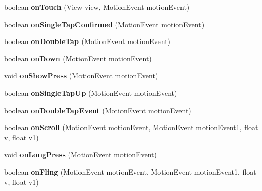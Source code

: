 \begin{DoxyCompactItemize}
\item 
\mbox{\label{classwavesimulator_1_1WaveViewTouchListener_a325c79c04591b29d1ccc2f17538f1b4e}} 
boolean {\bfseries on\+Touch} (View view, Motion\+Event motion\+Event)
\item 
\mbox{\label{classwavesimulator_1_1WaveViewTouchListener_a812d58658cd4766b77acc6805c11bd5e}} 
boolean {\bfseries on\+Single\+Tap\+Confirmed} (Motion\+Event motion\+Event)
\item 
\mbox{\label{classwavesimulator_1_1WaveViewTouchListener_a9dc7880808de5d6211b235eea093010b}} 
boolean {\bfseries on\+Double\+Tap} (Motion\+Event motion\+Event)
\item 
\mbox{\label{classwavesimulator_1_1WaveViewTouchListener_a8fe377045999aa7d7e0c177602294a77}} 
boolean {\bfseries on\+Down} (Motion\+Event motion\+Event)
\item 
\mbox{\label{classwavesimulator_1_1WaveViewTouchListener_a27e41c2afd3355b733980f0a1b3cc443}} 
void {\bfseries on\+Show\+Press} (Motion\+Event motion\+Event)
\item 
\mbox{\label{classwavesimulator_1_1WaveViewTouchListener_a65b57a542917ca9748b4b1a61a1dfea3}} 
boolean {\bfseries on\+Single\+Tap\+Up} (Motion\+Event motion\+Event)
\item 
\mbox{\label{classwavesimulator_1_1WaveViewTouchListener_aca5036fc983c0688503c69c153c057f0}} 
boolean {\bfseries on\+Double\+Tap\+Event} (Motion\+Event motion\+Event)
\item 
\mbox{\label{classwavesimulator_1_1WaveViewTouchListener_ab9902752f747fee07f7ebba8f759e6ad}} 
boolean {\bfseries on\+Scroll} (Motion\+Event motion\+Event, Motion\+Event motion\+Event1, float v, float v1)
\item 
\mbox{\label{classwavesimulator_1_1WaveViewTouchListener_a38c5a9641b2585940c53e9be126675fe}} 
void {\bfseries on\+Long\+Press} (Motion\+Event motion\+Event)
\item 
\mbox{\label{classwavesimulator_1_1WaveViewTouchListener_ab5306d4dc5257a10a1494f8abefd102d}} 
boolean {\bfseries on\+Fling} (Motion\+Event motion\+Event, Motion\+Event motion\+Event1, float v, float v1)
\end{DoxyCompactItemize}
